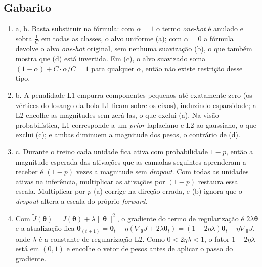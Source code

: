 \documentclass{dlproblemset}
\begin{document}
\subsection*{Gabarito}
\color{blue}
\begin{enumerate}[1)]

    \item a, b. Basta substituir na fórmula: com $\alpha=1$ o termo \textit{one-hot} é anulado e sobra $\frac{1}{C}$ em todas as classes, o alvo uniforme (a); com $\alpha=0$ a fórmula devolve o alvo \textit{one-hot} original, sem nenhuma suavização (b), o que também mostra que (d) está invertida. Em (c), o alvo suavizado soma $(1-\alpha) + C \cdot \alpha/C = 1$ para qualquer $\alpha$, então não existe restrição desse tipo.

    \item b. A penalidade L1 empurra componentes pequenos até exatamente zero (os vértices do losango da bola L1 ficam sobre os eixos), induzindo esparsidade; a L2 encolhe as magnitudes sem zerá-las, o que exclui (a). Na visão probabilística, L1 corresponde a um \textit{prior} laplaciano e L2 ao gaussiano, o que exclui (c); e ambas diminuem a magnitude dos pesos, o contrário de (d).

    \item c. Durante o treino cada unidade fica ativa com probabilidade $1-p$, então a magnitude esperada das ativações que as camadas seguintes aprenderam a receber é $(1-p)$ vezes a magnitude sem \textit{dropout}. Com todas as unidades ativas na inferência, multiplicar as ativações por $(1-p)$ restaura essa escala. Multiplicar por $p$ (a) corrige na direção errada, e (b) ignora que o \textit{dropout} altera a escala do próprio \textit{forward}.

    \item Com $\tilde{J}(\boldsymbol{\theta}) = J(\boldsymbol{\theta}) + \lambda\|\boldsymbol{\theta}\|^2$, o gradiente do termo de regularização é $2\lambda\boldsymbol{\theta}$ e a atualização fica $\boldsymbol{\theta}_{(t+1)}=\boldsymbol{\theta}_t - \eta(\nabla_{\boldsymbol{\theta}} J + 2\lambda\boldsymbol{\theta}_t) = (1 - 2\eta \lambda)\boldsymbol{\theta}_t - \eta\nabla_{\boldsymbol{\theta}} J$, onde $\lambda$ é a constante de regularização L2. Como $0 < 2\eta\lambda < 1$, o fator $1 - 2\eta\lambda$ está em $(0,1)$ e encolhe o vetor de pesos antes de aplicar o passo do gradiente.


\end{enumerate}
\end{document}
